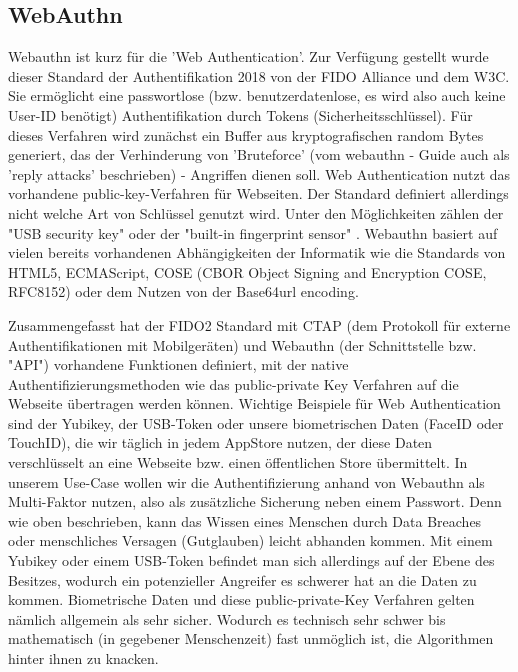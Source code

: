 \subsection{WebAuthn}
Webauthn ist kurz für die 'Web Authentication'. Zur Verfügung gestellt wurde dieser Standard der Authentifikation 2018 von der FIDO Alliance und dem W3C. \cite{A7} Sie ermöglicht eine passwortlose (bzw. benutzerdatenlose, es wird also auch keine User-ID benötigt) Authentifikation durch Tokens (Sicherheitsschlüssel). Für dieses Verfahren wird zunächst ein Buffer aus kryptografischen random Bytes generiert, das der Verhinderung von 'Bruteforce' (vom webauthn - Guide auch als 'reply attacks' beschrieben) - Angriffen dienen soll. Web Authentication nutzt das vorhandene public-key-Verfahren für Webseiten. Der Standard definiert allerdings nicht welche Art von Schlüssel genutzt wird. Unter den Möglichkeiten zählen der "USB security key" \cite{A7} oder der "built-in fingerprint sensor" \cite{A7}. Webauthn basiert auf vielen bereits vorhandenen Abhängigkeiten der Informatik wie die Standards von HTML5, ECMAScript, COSE (CBOR Object Signing and Encryption COSE, RFC8152) oder dem Nutzen von der Base64url encoding.

Zusammengefasst hat der FIDO2 Standard mit CTAP (dem Protokoll für externe Authentifikationen mit Mobilgeräten) und Webauthn (der Schnittstelle bzw. "API") vorhandene Funktionen definiert, mit der native Authentifizierungsmethoden wie das public-private Key Verfahren auf die Webseite übertragen werden können. Wichtige Beispiele für Web Authentication sind der Yubikey, der USB-Token oder unsere biometrischen Daten (FaceID oder TouchID), die wir täglich in jedem AppStore nutzen, der diese Daten verschlüsselt an eine Webseite bzw. einen öffentlichen Store übermittelt. In unserem Use-Case wollen wir die Authentifizierung anhand von Webauthn als Multi-Faktor nutzen, also als zusätzliche Sicherung neben einem Passwort. Denn wie oben beschrieben, kann das Wissen eines Menschen durch Data Breaches oder menschliches Versagen (Gutglauben) leicht abhanden kommen. Mit einem Yubikey oder einem USB-Token befindet man sich allerdings auf der Ebene des Besitzes, wodurch ein potenzieller Angreifer es schwerer hat an die Daten zu kommen. Biometrische Daten und diese public-private-Key Verfahren gelten nämlich allgemein als sehr sicher. Wodurch es technisch sehr schwer bis mathematisch (in gegebener Menschenzeit) fast unmöglich ist, die Algorithmen hinter ihnen zu knacken.
